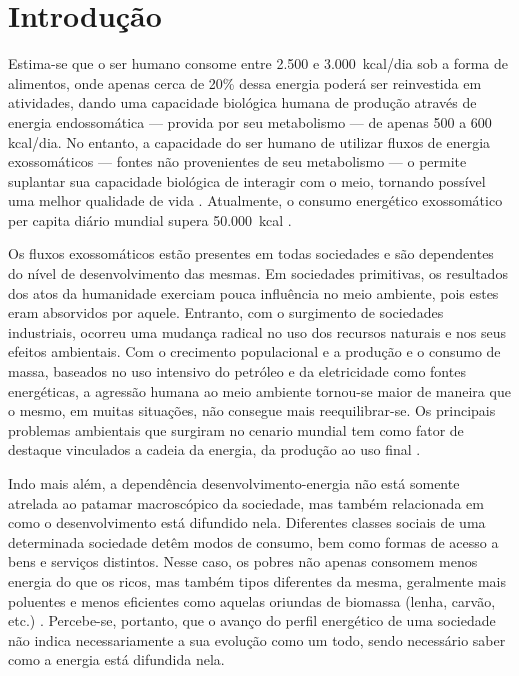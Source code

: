 \chapter{Introdução}

Estima-se que o ser humano consome entre 2.500 e 3.000~\acrshort{kcal}/dia sob a 
forma de alimentos, onde apenas cerca de 20\% dessa energia poderá ser 
reinvestida em atividades, dando uma capacidade biológica humana de produção
através de energia endossomática --- provida por seu metabolismo --- de 
apenas 500 a 600 \acrshort{kcal}/dia. No entanto, a capacidade do ser humano de
utilizar fluxos de energia exossomáticos --- fontes não provenientes de seu metabolismo 
--- o permite suplantar sua capacidade biológica de interagir com o meio,
tornando possível uma melhor qualidade de vida \cite{rippel}. 
Atualmente, o consumo energético exossomático per capita diário 
mundial supera 50.000~\acrshort{kcal} \cite{world_statics_2012}.

Os fluxos exossomáticos estão presentes em todas sociedades e são dependentes do
nível de desenvolvimento das mesmas. Em sociedades primitivas, os resultados dos
atos da humanidade exerciam pouca influência no meio ambiente, pois estes eram
absorvidos por aquele. Entranto, com o surgimento de sociedades industriais,
ocorreu uma mudança radical no uso dos recursos naturais e nos seus efeitos
ambientais. Com o crecimento populacional e a produção e o consumo de massa, 
baseados no uso intensivo do petróleo e da eletricidade 
como fontes energéticas, a agressão humana ao meio 
ambiente tornou-se maior de maneira que o mesmo, em muitas situações, não 
consegue mais reequilibrar-se. Os principais problemas ambientais que surgiram 
no cenario mundial tem como fator de destaque vinculados a cadeia da energia, 
da produção ao uso final \cite{rippel,jatoba}.

Indo mais além, a dependência desenvolvimento-energia não está somente atrelada
ao patamar macroscópico da sociedade, mas também relacionada em como o
desenvolvimento está difundido nela. Diferentes classes sociais de uma
determinada sociedade detêm modos de consumo, bem como formas de acesso a bens e
serviços distintos. Nesse caso, os pobres não apenas consomem menos
energia do que os ricos, mas também tipos diferentes da mesma, geralmente mais
poluentes e menos eficientes como aquelas oriundas de biomassa (lenha, carvão,
etc.) \cite{rippel}. Percebe-se, portanto, que o avanço do perfil energético de
uma sociedade não indica necessariamente a sua evolução como um todo, sendo
necessário saber como a energia está difundida nela.

